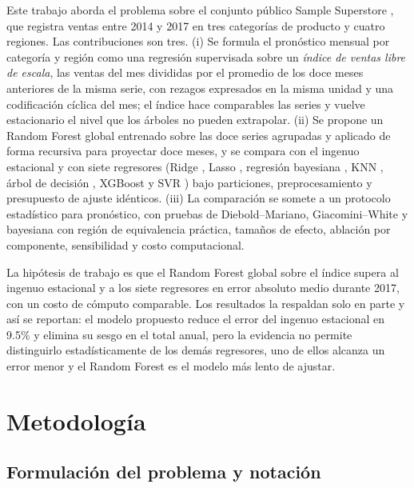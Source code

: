 \documentclass[pdflatex,sn-mathphys-num]{sn-jnl}
\begin{document}
Este trabajo aborda el problema sobre el conjunto público Sample Superstore \cite{superstore}, que registra ventas entre 2014 y 2017 en tres categorías de producto y cuatro regiones. Las contribuciones son tres. (i) Se formula el pronóstico mensual por categoría y región como una regresión supervisada sobre un \emph{índice de ventas libre de escala}, las ventas del mes divididas por el promedio de los doce meses anteriores de la misma serie, con rezagos expresados en la misma unidad y una codificación cíclica del mes; el índice hace comparables las series y vuelve estacionario el nivel que los árboles no pueden extrapolar. (ii) Se propone un Random Forest global entrenado sobre las doce series agrupadas y aplicado de forma recursiva para proyectar doce meses, y se compara con el ingenuo estacional y con siete regresores (Ridge \cite{hoerl1970}, Lasso \cite{tibshirani1996}, regresión bayesiana \cite{mackay1992}, KNN \cite{cover1967}, árbol de decisión \cite{breiman1984}, XGBoost \cite{chen2016} y SVR \cite{drucker1997}) bajo particiones, preprocesamiento y presupuesto de ajuste idénticos. (iii) La comparación se somete a un protocolo estadístico para pronóstico, con pruebas de Diebold--Mariano, Giacomini--White y bayesiana con región de equivalencia práctica, tamaños de efecto, ablación por componente, sensibilidad y costo computacional.

La hipótesis de trabajo es que el Random Forest global sobre el índice supera al ingenuo estacional y a los siete regresores en error absoluto medio durante 2017, con un costo de cómputo comparable. Los resultados la respaldan solo en parte y así se reportan: el modelo propuesto reduce el error del ingenuo estacional en 9.5\% y elimina su sesgo en el total anual, pero la evidencia no permite distinguirlo estadísticamente de los demás regresores, uno de ellos alcanza un error menor y el Random Forest es el modelo más lento de ajustar.

\section{Metodología}\label{sec:metodologia}

\subsection{Formulación del problema y notación}\label{subsec:formulacion}
\end{document}
